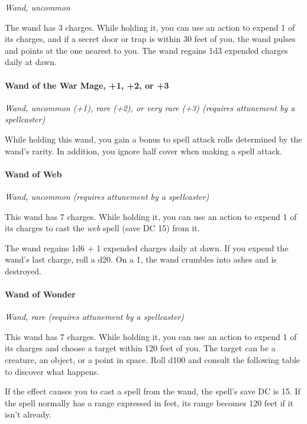\documentclass[
]{article}
\begin{document}
\emph{Wand, uncommon}

The wand has 3 charges. While holding it, you can use an action to
expend 1 of its charges, and if a secret door or trap is within 30 feet
of you, the wand pulses and points at the one nearest to you. The wand
regains 1d3 expended charges daily at dawn.

\hypertarget{wand-of-the-war-mage-1-2-or-3}{%
\paragraph{Wand of the War Mage, +1, +2, or
+3}\label{wand-of-the-war-mage-1-2-or-3}}

\emph{Wand, uncommon (+1), rare (+2), or very rare (+3) (requires
attunement by a spellcaster)}

While holding this wand, you gain a bonus to spell attack rolls
determined by the wand's rarity. In addition, you ignore half cover when
making a spell attack.

\hypertarget{wand-of-web}{%
\paragraph{Wand of Web}\label{wand-of-web}}

\emph{Wand, uncommon (requires attunement by a spellcaster)}

This wand has 7 charges. While holding it, you can use an action to
expend 1 of its charges to cast the \emph{web} spell (save DC 15) from
it.

The wand regains 1d6 + 1 expended charges daily at dawn. If you expend
the wand's last charge, roll a d20. On a 1, the wand crumbles into ashes
and is destroyed.

\hypertarget{wand-of-wonder}{%
\paragraph{Wand of Wonder}\label{wand-of-wonder}}

\emph{Wand, rare (requires attunement by a spellcaster)}

This wand has 7 charges. While holding it, you can use an action to
expend 1 of its charges and choose a target within 120 feet of you. The
target can be a creature, an object, or a point in space. Roll d100 and
consult the following table to discover what happens.

If the effect causes you to cast a spell from the wand, the spell's save
DC is 15. If the spell normally has a range expressed in feet, its range
becomes 120 feet if it isn't already.
\end{document}
